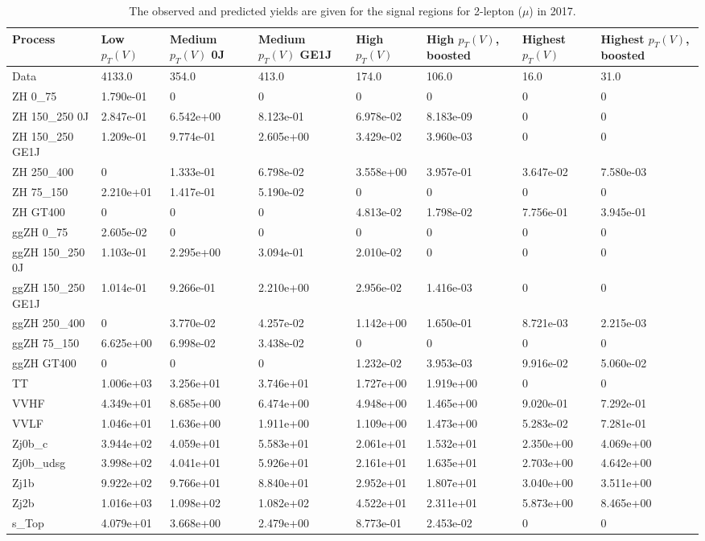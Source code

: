 \begin{table}
\centering
\caption[2017 2-lepton ($\mu$) signal selection yields]{
                  The observed and predicted yields are given for the
                  signal regions for 2-lepton ($\mu$) in 2017.
                  }
{\footnotesize
\begin{tabularx}{\textwidth}{|X|X|X|X|X|X|X|X|}
\hline
Process & Low $p_{T}(V)$ & Medium $p_{T}(V)$ 0J & Medium $p_{T}(V)$ GE1J & High $p_{T}(V)$ & High $p_{T}(V)$, boosted & Highest $p_{T}(V)$ & Highest $p_{T}(V)$, boosted \\
\hline
Data & 4133.0 & 354.0 & 413.0 & 174.0 & 106.0 & 16.0 & 31.0 \\
\hline
ZH 0\_75 & 1.790e-01 & 0 & 0 & 0 & 0 & 0 & 0 \\
ZH 150\_250 0J & 2.847e-01 & 6.542e+00 & 8.123e-01 & 6.978e-02 & 8.183e-09 & 0 & 0 \\
ZH 150\_250 GE1J & 1.209e-01 & 9.774e-01 & 2.605e+00 & 3.429e-02 & 3.960e-03 & 0 & 0 \\
ZH 250\_400 & 0 & 1.333e-01 & 6.798e-02 & 3.558e+00 & 3.957e-01 & 3.647e-02 & 7.580e-03 \\
ZH 75\_150 & 2.210e+01 & 1.417e-01 & 5.190e-02 & 0 & 0 & 0 & 0 \\
ZH GT400 & 0 & 0 & 0 & 4.813e-02 & 1.798e-02 & 7.756e-01 & 3.945e-01 \\
ggZH 0\_75 & 2.605e-02 & 0 & 0 & 0 & 0 & 0 & 0 \\
ggZH 150\_250 0J & 1.103e-01 & 2.295e+00 & 3.094e-01 & 2.010e-02 & 0 & 0 & 0 \\
ggZH 150\_250 GE1J & 1.014e-01 & 9.266e-01 & 2.210e+00 & 2.956e-02 & 1.416e-03 & 0 & 0 \\
ggZH 250\_400 & 0 & 3.770e-02 & 4.257e-02 & 1.142e+00 & 1.650e-01 & 8.721e-03 & 2.215e-03 \\
ggZH 75\_150 & 6.625e+00 & 6.998e-02 & 3.438e-02 & 0 & 0 & 0 & 0 \\
ggZH GT400 & 0 & 0 & 0 & 1.232e-02 & 3.953e-03 & 9.916e-02 & 5.060e-02 \\
\hline
TT & 1.006e+03 & 3.256e+01 & 3.746e+01 & 1.727e+00 & 1.919e+00 & 0 & 0 \\
VVHF & 4.349e+01 & 8.685e+00 & 6.474e+00 & 4.948e+00 & 1.465e+00 & 9.020e-01 & 7.292e-01 \\
VVLF & 1.046e+01 & 1.636e+00 & 1.911e+00 & 1.109e+00 & 1.473e+00 & 5.283e-02 & 7.281e-01 \\
Zj0b\_c & 3.944e+02 & 4.059e+01 & 5.583e+01 & 2.061e+01 & 1.532e+01 & 2.350e+00 & 4.069e+00 \\
Zj0b\_udsg & 3.998e+02 & 4.041e+01 & 5.926e+01 & 2.161e+01 & 1.635e+01 & 2.703e+00 & 4.642e+00 \\
Zj1b & 9.922e+02 & 9.766e+01 & 8.840e+01 & 2.952e+01 & 1.807e+01 & 3.040e+00 & 3.511e+00 \\
Zj2b & 1.016e+03 & 1.098e+02 & 1.082e+02 & 4.522e+01 & 2.311e+01 & 5.873e+00 & 8.465e+00 \\
s\_Top & 4.079e+01 & 3.668e+00 & 2.479e+00 & 8.773e-01 & 2.453e-02 & 0 & 0 \\
\hline
\end{tabularx}
}
\label{tab:sr-Zmm-2017}
\end{table}

